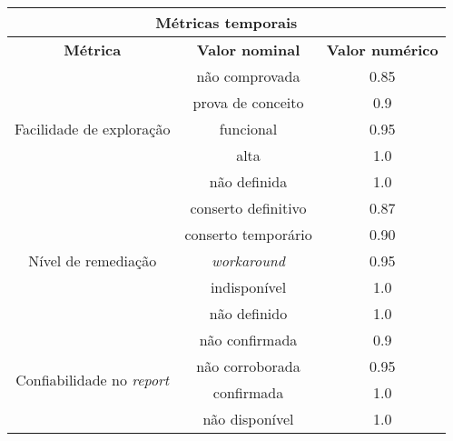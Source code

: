 	\begin{table}
		\begin{tabular}{|c|c|c|}
			\hline
			\multicolumn{3}{|c|}{ \textbf{Métricas temporais} } \\
			\hline
			\textbf{Métrica} & \textbf{Valor nominal} & \textbf{Valor numérico}\\
			\hline
			\multirow{5}{*}{Facilidade de exploração} & não comprovada & 0.85 \\
			& prova de conceito & 0.9 \\
			& funcional & 0.95 \\ 
			& alta & 1.0 \\
			& não definida & 1.0 \\ 
			\hline
			\multirow{5}{*}{Nível de remediação} & conserto definitivo  & 0.87 \\
			& conserto temporário & 0.90\\
			& \textsl{workaround} & 0.95\\
			& indisponível & 1.0\\
			& não definido & 1.0\\
			\hline
			\multirow{4}{*}{Confiabilidade no \textsl{report}} & não confirmada & 0.9 \\
			& não corroborada & 0.95\\
			& confirmada & 1.0\\
			& não disponível & 1.0\\
			\hline
		\end{tabular}
	\end{table}


